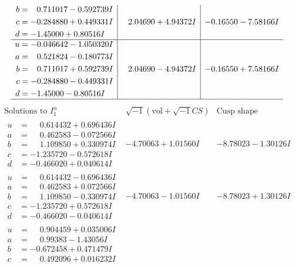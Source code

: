 \documentclass[1p]{elsarticle_modified}
\theoremstyle{definition}
\newcommand{\I}{\sqrt{-1}}
\begin{document}
$$\begin{array}{c|c|c}
\begin{aligned}
b &= \phantom{-}0.711017 - 0.592739 I \\
c &= -0.284880 + 0.449331 I \\
d &= -1.45000 + 0.80516 I\end{aligned}
 & \phantom{-}2.04690 + 4.94372 I & -0.16550 - 7.58166 I \\ \hline\begin{aligned}
u &= -0.046642 - 1.050320 I \\
a &= \phantom{-}0.521824 - 0.180773 I \\
b &= \phantom{-}0.711017 + 0.592739 I \\
c &= -0.284880 - 0.449331 I \\
d &= -1.45000 - 0.80516 I\end{aligned}
 & \phantom{-}2.04690 - 4.94372 I & -0.16550 + 7.58166 I\\
 \hline 
 \end{array}$$\newpage$$\begin{array}{c|c|c}  
\text{Solutions to }I^u_{1}& \I (\text{vol} + \sqrt{-1}CS) & \text{Cusp shape}\\
 \hline 
\begin{aligned}
u &= \phantom{-}0.614432 + 0.696436 I \\
a &= \phantom{-}0.462583 - 0.072566 I \\
b &= \phantom{-}1.109850 + 0.330974 I \\
c &= -1.235720 - 0.572618 I \\
d &= -0.466020 + 0.040614 I\end{aligned}
 & -4.70063 + 1.01560 I & -8.78023 - 1.30126 I \\ \hline\begin{aligned}
u &= \phantom{-}0.614432 - 0.696436 I \\
a &= \phantom{-}0.462583 + 0.072566 I \\
b &= \phantom{-}1.109850 - 0.330974 I \\
c &= -1.235720 + 0.572618 I \\
d &= -0.466020 - 0.040614 I\end{aligned}
 & -4.70063 - 1.01560 I & -8.78023 + 1.30126 I \\ \hline\begin{aligned}
u &= \phantom{-}0.904459 + 0.035006 I \\
a &= \phantom{-}0.99383 - 1.43056 I \\
b &= -0.672458 + 0.471479 I \\
c &= \phantom{-}0.492096 + 0.016232 I \\

\end{aligned}
\end{array}$$
\end{document}
